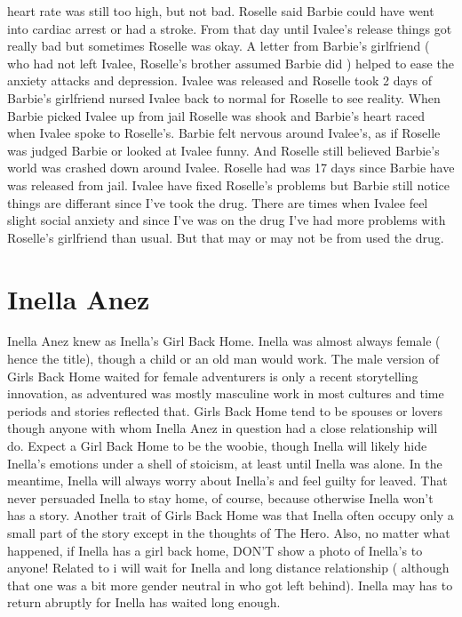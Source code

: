 \documentclass[12pt]{book}
\begin{document}
heart rate was still too high, but not bad. Roselle said Barbie could have went into cardiac arrest or had a stroke. From that day until Ivalee's release things got really bad but sometimes Roselle was okay. A letter from Barbie's girlfriend ( who had not left Ivalee, Roselle's brother assumed Barbie did ) helped to ease the anxiety attacks and depression. Ivalee was released and Roselle took 2 days of Barbie's girlfriend nursed Ivalee back to normal for Roselle to see reality. When Barbie picked Ivalee up from jail Roselle was shook and Barbie's heart raced when Ivalee spoke to Roselle's. Barbie felt nervous around Ivalee's, as if Roselle was judged Barbie or looked at Ivalee funny. And Roselle still believed Barbie's world was crashed down around Ivalee. Roselle had was 17 days since Barbie have was released from jail. Ivalee have fixed Roselle's problems but Barbie still notice things are differant since I've took the drug. There are times when Ivalee feel slight social anxiety and since I've was on the drug I've had more problems with Roselle's girlfriend than usual. But that may or may not be from used the drug.



\chapter{Inella Anez}

Inella Anez knew as Inella's Girl Back Home. Inella was almost always female ( hence the title), though a child or an old man would work. The male version of Girls Back Home waited for female adventurers is only a recent storytelling innovation, as adventured was mostly masculine work in most cultures and time periods and stories reflected that. Girls Back Home tend to be spouses or lovers though anyone with whom Inella Anez in question had a close relationship will do. Expect a Girl Back Home to be the woobie, though Inella will likely hide Inella's emotions under a shell of stoicism, at least until Inella was alone. In the meantime, Inella will always worry about Inella's and feel guilty for leaved. That never persuaded Inella to stay home, of course, because otherwise Inella won't has a story. Another trait of Girls Back Home was that Inella often occupy only a small part of the story except in the thoughts of The Hero. Also, no matter what happened, if Inella has a girl back home, DON'T show a photo of Inella's to anyone! Related to i will wait for Inella and long distance relationship ( although that one was a bit more gender neutral in who got left behind). Inella may has to return abruptly for Inella has waited long enough.
\end{document}
